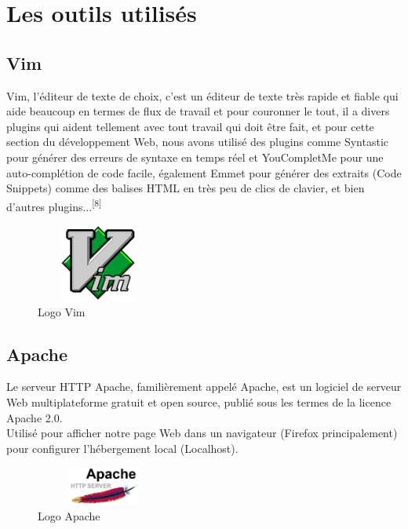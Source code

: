 \documentclass[12pt]{report}
\begin{document}
\vspace*{-0.3in}

\section{Les outils utilisés}

\subsection{Vim}

Vim, l'éditeur de texte de choix, c'est un éditeur de texte très rapide et fiable qui aide beaucoup en termes de flux de travail et pour couronner le tout, il a divers plugins qui aident tellement avec tout travail qui doit être fait, et pour cette section du développement Web, nous avons utilisé des plugins comme Syntastic pour générer des erreurs de syntaxe en temps réel et YouCompletMe pour une auto-complétion de code facile, également Emmet pour générer des extraits (Code Snippets) comme des balises HTML en très peu de clics de clavier, et bien d'autres plugins...\textsuperscript{[8]}

\begin{figure}[h]
\centering
    \includegraphics[width = 1.6in, height = 1in]{../Images/Vim.png}
\caption{Logo Vim}
\end{figure}

\vspace{-0.42in}

\subsection{Apache}

Le serveur HTTP Apache, familièrement appelé Apache, est un logiciel de serveur Web multiplateforme gratuit et open source, publié sous les termes de la licence Apache 2.0.
\\
Utilisé pour afficher notre page Web dans un navigateur (Firefox principalement) pour configurer l'hébergement local (Localhost).

\begin{figure}[h]
\centering
    \includegraphics[width = 1.73in, height = 0.5in]{../Images/Apache.png}
\caption{Logo Apache}
\vspace{-0.3in}
\end{figure}
\end{document}
